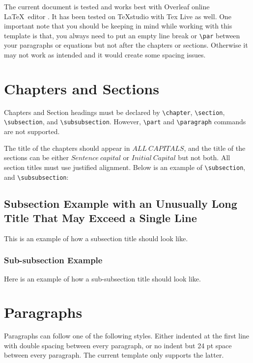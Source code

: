 \documentclass[a4paper,12pt,oneside]{report}
\begin{document}
The current document is tested and works best with Overleaf online \LaTeX~editor \cite{overleaf}. It has been tested on TeXstudio with Tex Live as well. One important note that you should be keeping in mind while working with this template is that, you always need to put an empty line break or \texttt{\textbackslash{par}} between your paragraphs or equations but not after the chapters or sections. Otherwise it may not work as intended and it would create some spacing issues.

\section{Chapters and Sections}\label{sec:chaptersnadsections}
Chapters and Section headings must be declared by \texttt{\textbackslash{chapter}}, \texttt{\textbackslash{section}}, \texttt{\textbackslash{subsection}}, and \texttt{\textbackslash{subsubsection}}. However, \texttt{\textbackslash{part}} and \texttt{\textbackslash{paragraph}} commands are not supported.

The title of the chapters should appear in $ALL~CAPITALS$, and the title of the sections can be either $Sentence~capital$ or $Initial~Capital$ but not both. All section titles must use justified alignment. Below is an example of \texttt{\textbackslash{subsection}}, and \texttt{\textbackslash{subsubsection}}:

\subsection{Subsection Example with an Unusually Long Title That May Exceed a Single Line}\label{subsec:subsectionexample}
This is an example of how a subsection title should look like.

\subsubsection{Sub-subsection Example}\label{subsubsec:subsubsectionexample}
Here is an example of how a sub-subsection title should look like.

\section{Paragraphs}\label{sec:paragraphs}
Paragraphs can follow one of the following styles. Either indented at the first line with double spacing between every paragraph, or no indent but 24 pt space between every paragraph. The current template only supports the latter.
\end{document}
